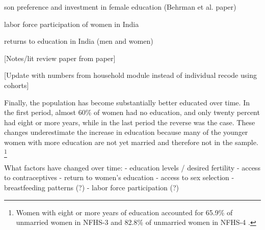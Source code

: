 son preference and investment in female education (Behrman et al. paper)

labor force participation of women in India

returns to education in India (men and women)

[Notes/lit review paper from paper]

[Update with numbers from household module instead of individual recode using cohorts]

Finally, the population has become substantially better educated over time.
In the first period, almost 60\% of women had no education, and only twenty percent had
eight or more years, while in the last period the reverse was the case.
These changes underestimate the increase in education because many of the younger women 
with more education are not yet married and therefore not in the sample.%
\footnote{
Women with eight or more years of education accounted for 65.9\% of
unmarried women in NFHS-3 and 82.8\% of unmarried women in NFHS-4
\citep{International-Institute-for-Population-Sciences-IIPS2007,International-Institute-for-Population-Sciences-IIPS2017}.
}



What factors have changed over time:
    - education levels / desired fertility
    - access to contraceptives
    - return to women's education
    - access to sex selection
    - breastfeeding patterns (?)
    - labor force participation (?)


